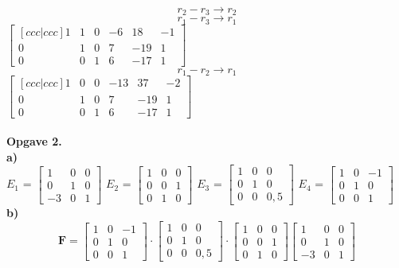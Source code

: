 \documentclass[12pt]{article}
\begin{document}
{$$r_2 - r_3 \rightarrow r_2$$
$$r_1 - r_3 \rightarrow r_1$$
$
\begin{bmatrix}[ccc|ccc]
1 & 1 & 0  & -6 & 18 & -1 \\  
0 & 1 & 0 & 7 & -19 & 1 \\
0 & 0 & 1 & 6 & -17 & 1
\end{bmatrix}
$\\


$$r_1 - r_2 \rightarrow r_1$$
$
\begin{bmatrix}[ccc|ccc]
1 & 0 & 0  & -13 & 37 & -2 \\  
0 & 1 & 0 & 7 & -19 & 1 \\
0 & 0 & 1 & 6 & -17 & 1
\end{bmatrix}
$\\\\

\textbf{\large Opgave 2.}\\

\textbf{a)}\\

\textbf{$E_1$} = $
\begin{bmatrix}
1 & 0 & 0 \\
0 & 1 & 0 \\
-3 & 0 & 1
\end{bmatrix}
$
\textbf{$E_2$} = $
\begin{bmatrix}
1 & 0 & 0 \\
0 & 0 & 1 \\
0 & 1 & 0
\end{bmatrix}
$
\textbf{$E_3$} = $
\begin{bmatrix}
1 & 0 & 0 \\
0 & 1 & 0 \\
0 & 0 & 0,5
\end{bmatrix}
$
\textbf{$E_4$} = $
\begin{bmatrix}
1 & 0 & -1 \\
0 & 1 & 0 \\
0 & 0 & 1
\end{bmatrix}
$\\

\textbf{b)}\\

$$\textbf{F} =  
\begin{bmatrix}
1 & 0 & -1 \\
0 & 1 & 0 \\
0 & 0 & 1
\end{bmatrix}
\cdot
\begin{bmatrix}
1 & 0 & 0 \\
0 & 1 & 0 \\
0 & 0 & 0,5
\end{bmatrix}
\cdot 
\begin{bmatrix}
1 & 0 & 0 \\
0 & 0 & 1 \\
0 & 1 & 0
\end{bmatrix}
\begin{bmatrix}
1 & 0 & 0 \\
0 & 1 & 0 \\
-3 & 0 & 1
\end{bmatrix}
$$

}
\end{document}
